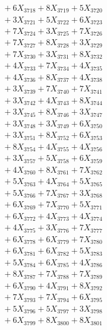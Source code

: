 \documentclass[a4paper,10pt]{article}
\begin{document}
{\begin{align}
&\;  + 6 X_{3718} + 8 X_{3719} + 5 X_{3720} \\[0.3ex]
&\;  + 3 X_{3721} + 5 X_{3722} + 6 X_{3723} \\[0.3ex]
&\;  + 7 X_{3724} + 3 X_{3725} + 7 X_{3726} \\[0.3ex]
&\;  + 7 X_{3727} + 8 X_{3728} + 3 X_{3729} \\[0.5ex]\allowbreak
&\;  + 7 X_{3730} + 3 X_{3731} + 8 X_{3732} \\[0.3ex]
&\;  + 4 X_{3733} + 7 X_{3734} + 4 X_{3735} \\[0.3ex]
&\;  + 4 X_{3736} + 8 X_{3737} + 4 X_{3738} \\[0.3ex]
&\;  + 3 X_{3739} + 7 X_{3740} + 7 X_{3741} \\[0.3ex]
&\;  + 3 X_{3742} + 4 X_{3743} + 8 X_{3744} \\[0.3ex]
&\;  + 3 X_{3745} + 8 X_{3746} + 3 X_{3747} \\[0.3ex]
&\;  + 3 X_{3748} + 3 X_{3749} + 6 X_{3750} \\[0.3ex]
&\;  + 3 X_{3751} + 8 X_{3752} + 6 X_{3753} \\[0.3ex]
&\;  + 8 X_{3754} + 4 X_{3755} + 4 X_{3756} \\[0.3ex]
&\;  + 3 X_{3757} + 5 X_{3758} + 6 X_{3759} \\[0.5ex]\allowbreak
&\;  + 4 X_{3760} + 8 X_{3761} + 7 X_{3762} \\[0.3ex]
&\;  + 5 X_{3763} + 4 X_{3764} + 5 X_{3765} \\[0.3ex]
&\;  + 5 X_{3766} + 7 X_{3767} + 3 X_{3768} \\[0.3ex]
&\;  + 6 X_{3769} + 7 X_{3770} + 5 X_{3771} \\[0.3ex]
&\;  + 6 X_{3772} + 4 X_{3773} + 4 X_{3774} \\[0.3ex]
&\;  + 4 X_{3775} + 3 X_{3776} + 7 X_{3777} \\[0.3ex]
&\;  + 6 X_{3778} + 6 X_{3779} + 7 X_{3780} \\[0.3ex]
&\;  + 6 X_{3781} + 6 X_{3782} + 5 X_{3783} \\[0.3ex]
&\;  + 5 X_{3784} + 6 X_{3785} + 4 X_{3786} \\[0.3ex]
&\;  + 8 X_{3787} + 7 X_{3788} + 7 X_{3789} \\[0.5ex]\allowbreak
&\;  + 6 X_{3790} + 4 X_{3791} + 8 X_{3792} \\[0.3ex]
&\;  + 7 X_{3793} + 7 X_{3794} + 6 X_{3795} \\[0.3ex]
&\;  + 5 X_{3796} + 5 X_{3797} + 3 X_{3798} \\[0.3ex]
&\;  + 6 X_{3799} + 8 X_{3800} + 8 X_{3801} \\[0.3ex]

\end{align}}
\end{document}
